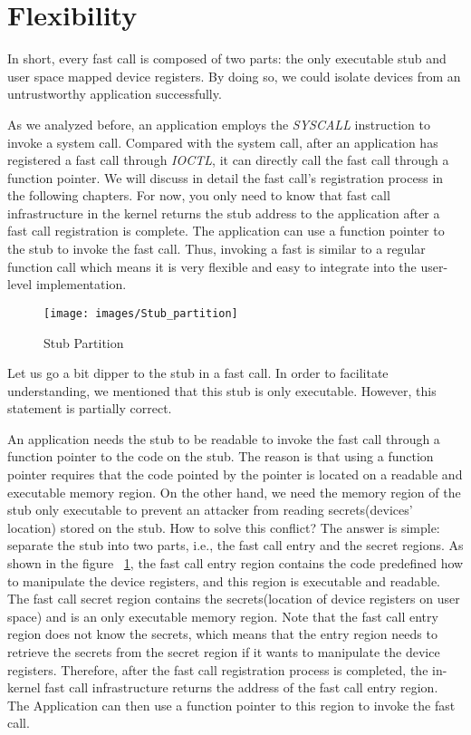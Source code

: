 \section{Flexibility}
In short, every fast call is composed of two parts: the only 
executable stub and user space mapped device registers. 
By doing so, we could isolate devices from an untrustworthy 
application successfully. 

As we analyzed before, an application employs the 
\emph{SYSCALL} instruction to invoke a system call. 
Compared with the system call, after an application has 
registered a fast call through \emph{IOCTL}, it can directly call 
the fast call through a function pointer. We will discuss 
in detail the fast call's registration process in the following 
chapters. For now, you only need to know that fast call infrastructure in the kernel 
returns the stub address to the application after a fast 
call registration is complete.  The application can use a 
function pointer to the stub to invoke the fast call. Thus, 
invoking a fast is similar to a regular function call which 
means it is very flexible and easy to integrate into the 
user-level implementation.

\begin{figure}[tbp]
  \centering
  \texttt{[image: images/Stub\_partition]}
  \caption[Short description]{Stub Partition}
  \label{fig:Stub_partition}
\end{figure}

Let us go a bit dipper to the stub in a fast call. 
In order to facilitate understanding, we mentioned that this 
stub is only executable. However, this statement is partially correct. 

An application needs the stub to be readable to invoke 
the fast call through a function pointer to the code on 
the stub. The reason is that using a function pointer requires 
that the code pointed by the pointer is located on a readable 
and executable memory region. On the other hand, we need the 
memory region of the stub only executable to prevent an attacker 
from reading secrets(devices' location) stored on the stub. 
How to solve this conflict? The answer is simple: separate the 
stub into two parts, i.e., the fast call entry and the secret regions. 
As shown in the figure  ~\ref{fig:Stub_partition}, the fast 
call entry region contains the code predefined how to manipulate 
the device registers, and this region is executable and readable. 
The fast call secret region contains the secrets(location of device 
registers on user space) and is an only executable memory region. 
Note that the fast call entry region does not know the secrets, 
which means that the entry region needs to retrieve the secrets 
from the secret region if it wants to manipulate the device registers.
Therefore, after the fast call registration process is completed, the 
in-kernel fast call infrastructure returns the address of the fast call entry 
region. The Application can then use a function pointer to this region to invoke the fast call.
